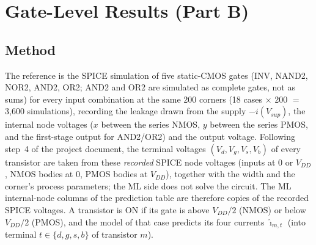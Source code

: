 \section{Gate-Level Results (Part B)}\label{sec:gates}

\subsection{Method}\label{sec:gates:method}
The reference is the SPICE simulation of five static-CMOS gates (INV, NAND2, NOR2, AND2, OR2; AND2 and OR2 are simulated as complete gates, not as sums) for every input combination at the same 200 corners (18 cases $\times$ 200 $=$ 3,600 simulations), recording the leakage drawn from the supply $-i(V_{sup})$, the internal node voltages ($x$ between the series NMOS, $y$ between the series PMOS, and the first-stage output for AND2/OR2) and the output voltage.
Following step~4 of the project document, the terminal voltages $(V_d,V_g,V_s,V_b)$ of every transistor are taken from these \emph{recorded} SPICE node voltages (inputs at 0 or $V_{DD}$, NMOS bodies at 0, PMOS bodies at $V_{DD}$), together with the width and the corner's process parameters; the ML side does not solve the circuit. The ML internal-node columns of the prediction table are therefore copies of the recorded SPICE voltages. A transistor is ON if its gate is above $V_{DD}/2$ (NMOS) or below $V_{DD}/2$ (PMOS), and the model of that case predicts its four currents $\hat\imath_{m,t}$ (into terminal $t\in\{d,g,s,b\}$ of transistor $m$).

